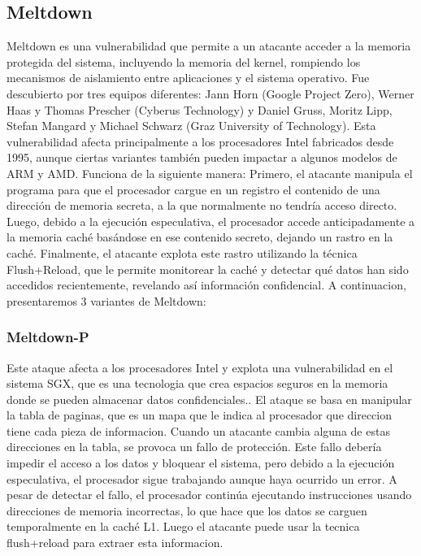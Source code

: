 \documentclass[lettersize,compsoc]{IEEEtran}
\begin{document}
\subsection{Meltdown}
Meltdown es una vulnerabilidad que permite a un atacante acceder a la memoria protegida del sistema, incluyendo la memoria del kernel, rompiendo los mecanismos de aislamiento entre aplicaciones y el sistema operativo. \cite{meltdown}
\newline Fue descubierto por tres equipos diferentes: Jann Horn (Google Project Zero), Werner Haas y Thomas Prescher (Cyberus Technology) y Daniel Gruss, Moritz Lipp, Stefan Mangard y Michael Schwarz (Graz University of Technology).
\newline Esta vulnerabilidad afecta principalmente a los procesadores Intel fabricados desde 1995, aunque ciertas variantes también pueden impactar a algunos modelos de ARM y AMD.
\newline Funciona de la siguiente manera:
\newline Primero, el atacante manipula el programa para que el procesador cargue en un registro el contenido de una dirección de memoria secreta, a la que normalmente no tendría acceso directo.
Luego, debido a la ejecución especulativa, el procesador accede anticipadamente a la memoria caché basándose en ese contenido secreto, dejando un rastro en la caché.
Finalmente, el atacante explota este rastro utilizando la técnica Flush+Reload, que le permite monitorear la caché y detectar qué datos han sido accedidos recientemente, revelando así información confidencial. \cite{meltdown}
\newline A continuacion, presentaremos 3 variantes de Meltdown:
\subsubsection{\textbf{Meltdown-P}}
Este ataque afecta a los procesadores Intel y explota una vulnerabilidad en el sistema SGX, que es una tecnologia que crea espacios seguros en la memoria donde se pueden almacenar datos confidenciales..
\newline El ataque se basa en manipular la tabla de paginas, que es un mapa que le indica al procesador que direccion tiene cada pieza de informacion. Cuando un atacante cambia alguna de estas direcciones en la tabla, se provoca un fallo de protección. Este fallo debería impedir el acceso a los datos y bloquear el sistema, pero debido a la ejecución especulativa, el procesador sigue trabajando aunque haya ocurrido un error. A pesar de detectar el fallo, el procesador continúa ejecutando instrucciones usando direcciones de memoria incorrectas, lo que hace que los datos se carguen temporalmente en la caché L1. Luego el atacante puede usar la tecnica flush+reload para extraer esta informacion. \cite{Meltdown variantes}
\end{document}
